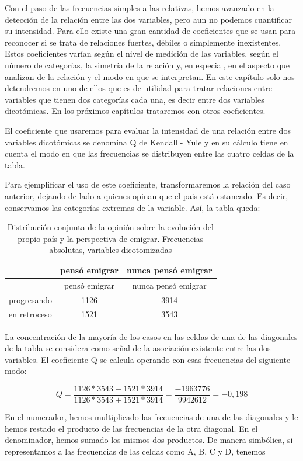 \documentclass[]{book}
\begin{document}
Con el paso de las frecuencias simples a las relativas, hemos avanzado en la detección de la relación entre las dos variables, pero aun no podemos cuantificar su intensidad. Para ello existe una gran cantidad de coeficientes que se usan para reconocer si se trata de relaciones fuertes, débiles o simplemente inexistentes. Estos coeficientes varían según el nivel de medición de las variables, según el número de categorías, la simetría de la relación y, en especial, en el aspecto que analizan de la relación y el modo en que se interpretan. En este capítulo solo nos detendremos en uno de ellos que es de utilidad para tratar relaciones entre variables que tienen dos categorías cada una, es decir entre dos variables dicotómicas. En los próximos capítulos trataremos con otros coeficientes.

El coeficiente que usaremos para evaluar la intensidad de una relación entre dos variables dicotómicas se denomina Q de Kendall - Yule y en su cálculo tiene en cuenta el modo en que las frecuencias se distribuyen entre las cuatro celdas de la tabla.

Para ejemplificar el uso de este coeficiente, transformaremos la
relación del caso anterior, dejando de lado a quienes opinan que el pais está estancado. Es decir, conservamos las categorías extremas de la variable. Así, la tabla queda:

\begin{longtable}[]{@{}lcc@{}}
\caption{\label{tab:unnamed-chunk-117}Distribución conjunta de la opinión sobre la evolución del propio país y la perspectiva de emigrar. Frecuencias absolutas, variables dicotomizadas}\tabularnewline
\toprule
& pensó emigrar & nunca pensó emigrar\tabularnewline
\midrule
\endfirsthead
\toprule
& pensó emigrar & nunca pensó emigrar\tabularnewline
\midrule
\endhead
progresando & 1126 & 3914\tabularnewline
en retroceso & 1521 & 3543\tabularnewline
\bottomrule
\end{longtable}

La concentración de la mayoría de los casos en las celdas de una de las diagonales de la tabla se considera como señal de la asociación existente entre las dos variables. El coeficiente Q se calcula operando con esas frecuencias del siguiente modo:

\[Q = \frac{1126*3543 - 1521*3914}{1126*3543 + 1521*3914} = \frac{-1963776}{9942612} = -0,198\]

En el numerador, hemos multiplicado las frecuencias de una de las
diagonales y le hemos restado el producto de las frecuencias
de la otra diagonal. En el denominador, hemos sumado los mismos
dos productos. De manera simbólica, si representamos a las frecuencias
de las celdas como A, B, C y D, tenemos
\end{document}
